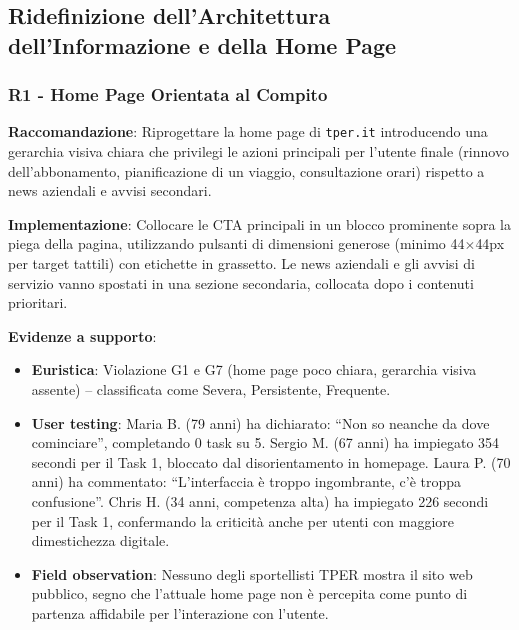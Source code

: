 \documentclass[11pt,a4paper]{article}
\begin{document}

\subsection{Ridefinizione dell'Architettura dell'Informazione e della Home Page}

\subsubsection{R1 - Home Page Orientata al Compito}
\label{rec:R1}

\textbf{Raccomandazione}: Riprogettare la home page di \texttt{tper.it}
introducendo una gerarchia visiva chiara che privilegi le azioni principali
per l'utente finale (rinnovo dell'abbonamento, pianificazione di un viaggio,
consultazione orari) rispetto a news aziendali e avvisi secondari.

\textbf{Implementazione}: Collocare le CTA principali in un blocco
prominente sopra la piega della pagina, utilizzando pulsanti di dimensioni
generose (minimo 44$\times$44px per target tattili) con etichette in
grassetto. Le news aziendali e gli avvisi di servizio vanno spostati in
una sezione secondaria, collocata dopo i contenuti prioritari.

\textbf{Evidenze a supporto}:
\begin{itemize}
    \item \textbf{Euristica}: Violazione G1 e G7 (home page poco chiara,
    gerarchia visiva assente) -- classificata come Severa, Persistente,
    Frequente.
    \item \textbf{User testing}: Maria B. (79 anni) ha dichiarato: “Non so
    neanche da dove cominciare”, completando 0 task su 5. Sergio M.
    (67 anni) ha impiegato 354 secondi per il Task 1, bloccato dal
    disorientamento in homepage. Laura P. (70 anni) ha commentato:
    “L'interfaccia è troppo ingombrante, c'è troppa confusione”.
    Chris H. (34 anni, competenza alta) ha impiegato 226 secondi per il
    Task 1, confermando la criticit\`a anche per utenti con maggiore
    dimestichezza digitale.
    \item \textbf{Field observation}: Nessuno degli sportellisti TPER mostra
    il sito web pubblico, segno che l’attuale home page non \`e percepita come
    punto di partenza affidabile per l’interazione con l’utente.
\end{itemize}
\end{document}
